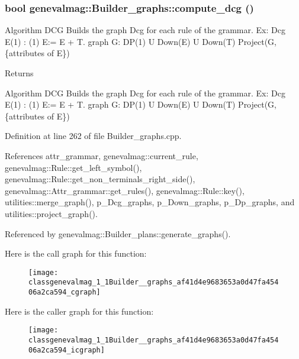 \hypertarget{classgenevalmag_1_1Builder__graphs_af41d4e9683653a0d47fa45406a2ca594}{
\subsubsection[{compute\_\-dcg}]{\setlength{\rightskip}{0pt plus 5cm}bool genevalmag::Builder\_\-graphs::compute\_\-dcg ()}}
\label{classgenevalmag_1_1Builder__graphs_af41d4e9683653a0d47fa45406a2ca594}
Algorithm DCG Builds the graph Dcg for each rule of the grammar. Ex: Dcg E(1) : (1) E:= E + T. graph G: DP(1) U Down(E) U Down(T) Project(G,\{attributes of E\}) \begin{DoxyReturn}{Returns}

\end{DoxyReturn}
Algorithm DCG Builds the graph Dcg for each rule of the grammar. Ex: Dcg E(1) : (1) E:= E + T. graph G: DP(1) U Down(E) U Down(T) Project(G,\{attributes of E\}) 

Definition at line 262 of file Builder\_\-graphs.cpp.



References attr\_\-grammar, genevalmag::current\_\-rule, genevalmag::Rule::get\_\-left\_\-symbol(), genevalmag::Rule::get\_\-non\_\-terminals\_\-right\_\-side(), genevalmag::Attr\_\-grammar::get\_\-rules(), genevalmag::Rule::key(), utilities::merge\_\-graph(), p\_\-Dcg\_\-graphs, p\_\-Down\_\-graphs, p\_\-Dp\_\-graphs, and utilities::project\_\-graph().



Referenced by genevalmag::Builder\_\-plans::generate\_\-graphs().



Here is the call graph for this function:\nopagebreak
\begin{figure}[H]
\begin{center}
\leavevmode
\texttt{[image: classgenevalmag\_1\_1Builder\_\_graphs\_af41d4e9683653a0d47fa45406a2ca594\_cgraph]}
\end{center}
\end{figure}




Here is the caller graph for this function:\nopagebreak
\begin{figure}[H]
\begin{center}
\leavevmode
\texttt{[image: classgenevalmag\_1\_1Builder\_\_graphs\_af41d4e9683653a0d47fa45406a2ca594\_icgraph]}
\end{center}
\end{figure}



